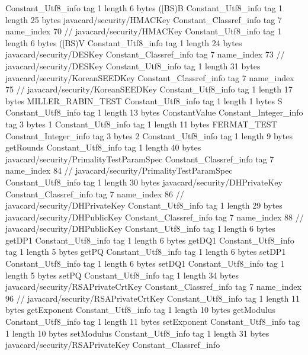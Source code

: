 {{{		}
		Constant_Utf8_info {
			tag	1
			length	6
			bytes	([BS)B
		}
		Constant_Utf8_info {
			tag	1
			length	25
			bytes	javacard/security/HMACKey
		}
		Constant_Classref_info {
			tag	7
			name_index	70		// javacard/security/HMACKey
		}
		Constant_Utf8_info {
			tag	1
			length	6
			bytes	([BS)V
		}
		Constant_Utf8_info {
			tag	1
			length	24
			bytes	javacard/security/DESKey
		}
		Constant_Classref_info {
			tag	7
			name_index	73		// javacard/security/DESKey
		}
		Constant_Utf8_info {
			tag	1
			length	31
			bytes	javacard/security/KoreanSEEDKey
		}
		Constant_Classref_info {
			tag	7
			name_index	75		// javacard/security/KoreanSEEDKey
		}
		Constant_Utf8_info {
			tag	1
			length	17
			bytes	MILLER_RABIN_TEST
		}
		Constant_Utf8_info {
			tag	1
			length	1
			bytes	S
		}
		Constant_Utf8_info {
			tag	1
			length	13
			bytes	ConstantValue
		}
		Constant_Integer_info {
			tag	3
			bytes	1
		}
		Constant_Utf8_info {
			tag	1
			length	11
			bytes	FERMAT_TEST
		}
		Constant_Integer_info {
			tag	3
			bytes	2
		}
		Constant_Utf8_info {
			tag	1
			length	9
			bytes	getRounds
		}
		Constant_Utf8_info {
			tag	1
			length	40
			bytes	javacard/security/PrimalityTestParamSpec
		}
		Constant_Classref_info {
			tag	7
			name_index	84		// javacard/security/PrimalityTestParamSpec
		}
		Constant_Utf8_info {
			tag	1
			length	30
			bytes	javacard/security/DHPrivateKey
		}
		Constant_Classref_info {
			tag	7
			name_index	86		// javacard/security/DHPrivateKey
		}
		Constant_Utf8_info {
			tag	1
			length	29
			bytes	javacard/security/DHPublicKey
		}
		Constant_Classref_info {
			tag	7
			name_index	88		// javacard/security/DHPublicKey
		}
		Constant_Utf8_info {
			tag	1
			length	6
			bytes	getDP1
		}
		Constant_Utf8_info {
			tag	1
			length	6
			bytes	getDQ1
		}
		Constant_Utf8_info {
			tag	1
			length	5
			bytes	getPQ
		}
		Constant_Utf8_info {
			tag	1
			length	6
			bytes	setDP1
		}
		Constant_Utf8_info {
			tag	1
			length	6
			bytes	setDQ1
		}
		Constant_Utf8_info {
			tag	1
			length	5
			bytes	setPQ
		}
		Constant_Utf8_info {
			tag	1
			length	34
			bytes	javacard/security/RSAPrivateCrtKey
		}
		Constant_Classref_info {
			tag	7
			name_index	96		// javacard/security/RSAPrivateCrtKey
		}
		Constant_Utf8_info {
			tag	1
			length	11
			bytes	getExponent
		}
		Constant_Utf8_info {
			tag	1
			length	10
			bytes	getModulus
		}
		Constant_Utf8_info {
			tag	1
			length	11
			bytes	setExponent
		}
		Constant_Utf8_info {
			tag	1
			length	10
			bytes	setModulus
		}
		Constant_Utf8_info {
			tag	1
			length	31
			bytes	javacard/security/RSAPrivateKey
		}
		Constant_Classref_info {
}}}
